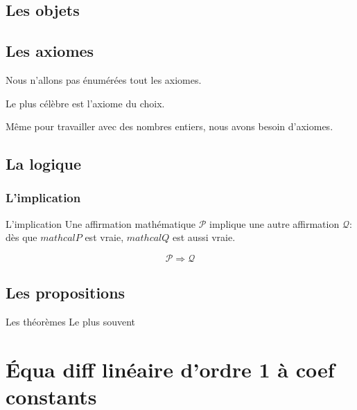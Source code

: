 \documentclass[11pt]{beamer}
\begin{document}
\subsection{Les objets}

\subsection{Les axiomes}
Nous n'allons pas énumérées tout les axiomes.

Le plus célèbre est l'axiome du choix.

Même pour travailler avec des nombres entiers, nous avons besoin d'axiomes.




\subsection{La logique}
\subsubsection{L'implication}
\begin{frame}{L'implication}
Une affirmation mathématique $\mathcal{P}$ implique une autre affirmation $\mathcal{Q}$:
dès que $mathcal{P}$ est vraie, $mathcal{Q}$ est aussi vraie.

$$\mathcal{P}\Rightarrow\mathcal{Q}$$
\end{frame}


\subsection{Les propositions}
\begin{frame}{Les théorèmes}
Le plus souvent 
\end{frame}


\section{\'{E}qua diff linéaire d'ordre 1 à coef constants}
\end{document}
